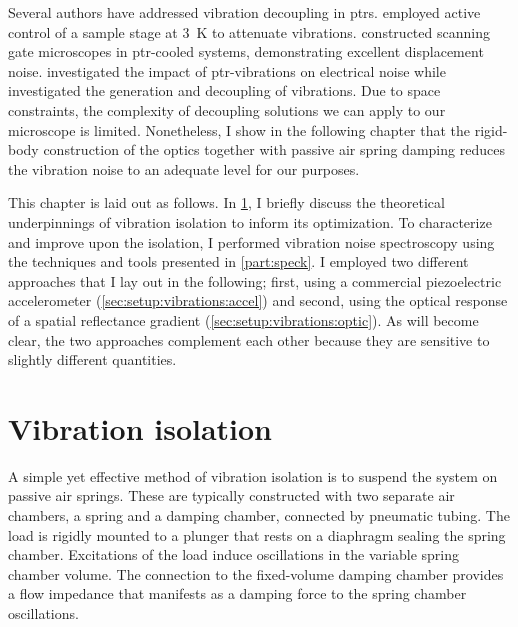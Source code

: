 Several authors have addressed vibration decoupling in \glspl{ptr}.
\citet{Caparrelli2006} employed active control of a sample stage at \qty{3}{\kelvin} to attenuate vibrations.
\citet{Pelliccione2013,Oh2021,Esser2024} constructed scanning gate microscopes in \gls{ptr}-cooled systems, demonstrating excellent displacement noise.
\citet{Kalra2016} investigated the impact of \gls{ptr}-vibrations on electrical noise while \citet{Riabzev2009,Olivieri2017,Schmoranzer2019} investigated the generation and decoupling of vibrations.
Due to space constraints, the complexity of decoupling solutions we can apply to our microscope is limited.
Nonetheless, I show in the following chapter that the rigid-body construction of the optics together with passive air spring damping reduces the vibration noise to an adequate level for our purposes.

This chapter is laid out as follows.
In \cref{sec:setup:vibrations:isolation}, I briefly discuss the theoretical underpinnings of vibration isolation to inform its optimization.
To characterize and improve upon the isolation, I performed vibration noise spectroscopy using the techniques and tools presented in \cref{part:speck}.
I employed two different approaches that I lay out in the following; first, using a commercial piezoelectric accelerometer (\cref{sec:setup:vibrations:accel}) and second, using the optical response of a spatial reflectance gradient (\cref{sec:setup:vibrations:optic}).
As will become clear, the two approaches complement each other because they are sensitive to slightly different quantities.

\section{Vibration isolation}\label{sec:setup:vibrations:isolation}
A simple yet effective method of vibration isolation is to suspend the system on passive air springs.
These are typically constructed with two separate air chambers, a spring and a damping chamber, connected by pneumatic tubing.
The load is rigidly mounted to a plunger that rests on a diaphragm sealing the spring chamber.
Excitations of the load induce oscillations in the variable spring chamber volume.
The connection to the fixed-volume damping chamber provides a flow impedance
that manifests as a damping force to the spring chamber oscillations.

